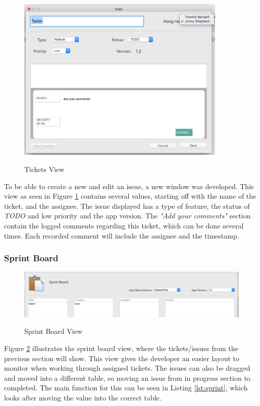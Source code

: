 \begin{figure}[!h]
    \caption{Tickets View}
    \centering
    \includegraphics[width=100mm]{images/dashboard/edit_issue}
    \label{fig:edit_issue-view}
\end{figure} 


To be able to create a new and edit an issue, a new window was developed. This view as seen in Figure \ref{fig:edit_issue-view} contains several values, starting off with the name of the ticket, and the assignee. The issue displayed has a type of feature, the status of \textit{TODO} and low priority and the app version. The \textit{"Add your comments"} section contain the logged comments regarding this ticket, which can be done several times. Each recorded comment will include the assignee and the timestamp.

\subsubsection{Sprint Board}

\begin{figure}[!h]
    \caption{Sprint Board View}
    \centering
    \includegraphics[width=150mm]{images/dashboard/sprint-board}
    \label{fig:sprint-board-view}
\end{figure} 

Figure \ref{fig:sprint-board-view} illustrates the sprint board view, where the tickets/issues from the previous section will show. This view gives the developer an easier layout to monitor when working through assigned tickets. The issues can also be dragged and moved into a different table, so moving an issue from in progress section to completed. The main function for this can be seen in Listing \ref{lst:sprint}, which looks after moving the value into the correct table.

